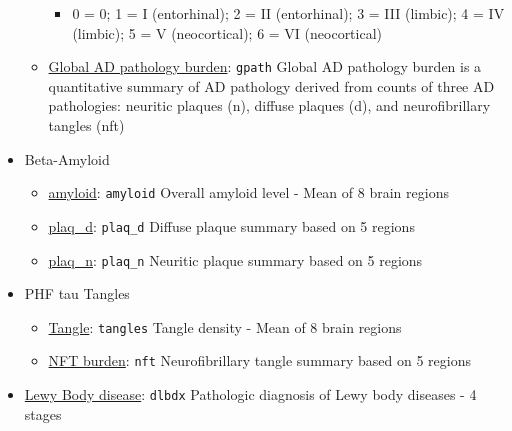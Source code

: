 \documentclass[]{book}
\providecommand{\tightlist}{%
  \setlength{\itemsep}{0pt}\setlength{\parskip}{0pt}}
\begin{document}
\begin{itemize}
\begin{itemize}
    \begin{itemize}
    \tightlist
    \item
      0 = 0; 1 = I (entorhinal); 2 = II (entorhinal); 3 = III (limbic); 4 = IV (limbic); 5 = V (neocortical); 6 = VI (neocortical)
    \end{itemize}
  \item
    \href{https://www.radc.rush.edu/docs/var/detail.htm?category=Pathology\&subcategory=Alzheimer\%27s+disease\&variable=gpath}{Global AD pathology burden}: \texttt{gpath} Global AD pathology burden is a quantitative summary of AD pathology derived from counts of three AD pathologies: neuritic plaques (n), diffuse plaques (d), and neurofibrillary tangles (nft)
  \end{itemize}
\item
  Beta-Amyloid

  \begin{itemize}
  \tightlist
  \item
    \href{https://www.radc.rush.edu/docs/var/detail.htm?category=Pathology\&subcategory=Beta-Amyloid\&variable=amyloid}{amyloid}: \texttt{amyloid} Overall amyloid level - Mean of 8 brain regions
  \item
    \href{https://www.radc.rush.edu/docs/var/detail.htm?category=Pathology\&subcategory=Beta-Amyloid\&variable=plaq_d}{plaq\_d}: \texttt{plaq\_d} Diffuse plaque summary based on 5 regions
  \item
    \href{https://www.radc.rush.edu/docs/var/detail.htm?category=Pathology\&subcategory=Beta-Amyloid\&variable=plaq_n}{plaq\_n}: \texttt{plaq\_n} Neuritic plaque summary based on 5 regions
  \end{itemize}
\item
  PHF tau Tangles

  \begin{itemize}
  \tightlist
  \item
    \href{https://www.radc.rush.edu/docs/var/detail.htm?category=Pathology\&subcategory=PHF+tau+tangles\&variable=tangles}{Tangle}: \texttt{tangles} Tangle density - Mean of 8 brain regions
  \item
    \href{https://www.radc.rush.edu/docs/var/detail.htm?category=Pathology\&subcategory=PHF+tau+tangles\&variable=nft}{NFT burden}: \texttt{nft} Neurofibrillary tangle summary based on 5 regions
  \end{itemize}
\item
  \href{https://www.radc.rush.edu/docs/var/detail.htm?category=Pathology\&subcategory=Lewy+body\%2fPD\&variable=dlbdx}{Lewy Body disease}: \texttt{dlbdx} Pathologic diagnosis of Lewy body diseases - 4 stages


\end{itemize}
\end{document}
